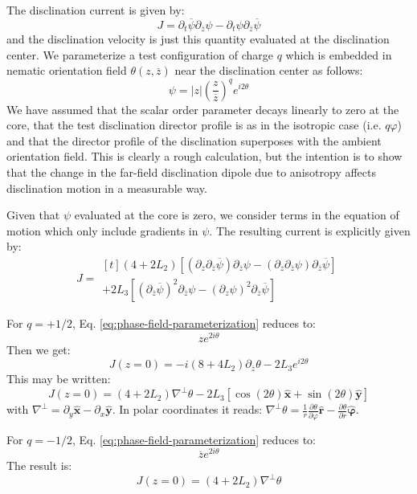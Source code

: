 \documentclass[reqno]{article}
\begin{document}
The disclination current is given by:
\begin{equation}
    J
    =
    \partial_t \overline{\psi} \partial_{\overline{z}} \psi - \partial_t \psi \partial_{\overline{z}} \overline{\psi}
\end{equation}
and the disclination velocity is just this quantity evaluated at the disclination center.
We parameterize a test configuration of charge $q$ which is embedded in nematic orientation field $\theta(z, \overline{z})$ near the disclination center as follows:
\begin{equation} \label{eq:phase-field-parameterization}
    \psi 
    =
    \left| z \right| \left( \frac{z}{\overline{z}} \right)^q e^{i 2 \theta}
\end{equation}
We have assumed that the scalar order parameter decays linearly to zero at the core, that the test disclination director profile is as in the isotropic case (i.e. $q\varphi$) and that the director profile of the disclination superposes with the ambient orientation field.
This is clearly a rough calculation, but the intention is to show that the change in the far-field disclination dipole due to anisotropy affects disclination motion in a measurable way.

Given that $\psi$ evaluated at the core is zero, we consider terms in the equation of motion which only include gradients in $\psi$.
The resulting current is explicitly given by:
\begin{equation}
    J
    =
    \begin{multlined}[t]
        \left(4 + 2 L_2 \right) \left[ \left( \partial_z \partial_{\overline{z}} \overline{\psi} \right) \partial_{\overline{z}} \psi
        - \left(\partial_z \partial_{\overline{z}} \psi \right) \partial_{\overline{z}} \overline{\psi} \right] \\
        + 2 L_3 \left[ \left(\partial_{\overline{z}} \overline{\psi} \right)^2 \partial_{\overline{z}} \psi
        - \left(\partial_{z} \psi \right)^2 \partial_{\overline{z}} \overline{\psi} \right]
    \end{multlined}
\end{equation}

For $q = +1/2$, Eq. \eqref{eq:phase-field-parameterization} reduces to:
\begin{equation}
    ze^{2i \theta}
\end{equation}
Then we get:
\begin{equation}
    J(z = 0)
    =
    -i\left(8 + 4 L_2 \right) \partial_{\overline{z}} \theta
    -2 L_3 e^{i 2 \theta}
\end{equation}
This may be written:
\begin{equation}
    J(z = 0)
    =
    \left(4 + 2 L_2 \right) \nabla^\perp \theta
    - 2 L_3 \left[ \cos(2 \theta) \hat{\mathbf{x}} + \sin(2\theta) \hat{\mathbf{y}} \right]
\end{equation}
with $\nabla^\perp = \partial_y \hat{\mathbf{x}} - \partial_x \hat{\mathbf{y}}$.
In polar coordinates it reads: $\nabla^\perp \theta = \frac{1}{r} \frac{\partial \theta}{\partial \varphi} \hat{\mathbf{r}} - \frac{\partial \theta}{\partial r} \hat{\boldsymbol{\varphi}}$.

For $q = -1/2$, Eq. \eqref{eq:phase-field-parameterization} reduces to:
\begin{equation}
    \overline{z} e^{2i \theta}
\end{equation}
The result is:
\begin{equation}
    J(z = 0)
    =
    \left(4 + 2 L_2 \right) \nabla^\perp \theta
\end{equation}
\end{document}
